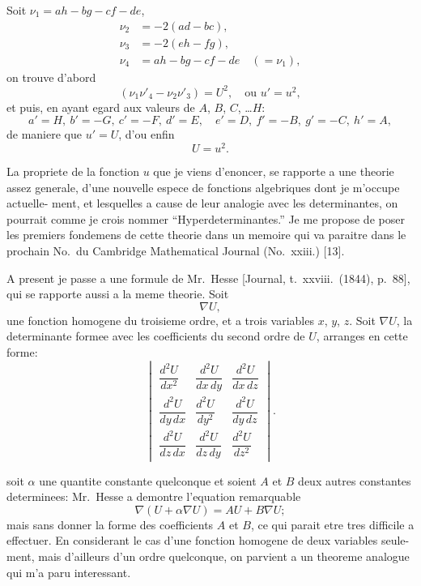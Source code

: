 \documentclass[12pt,a4paper]{article}
\begin{document}
Soit $\nu_1 = ah - bg - cf - de$,
\begin{align*}
\nu_2 &= -2(ad - bc),\\
\nu_3 &= -2(eh - fg),\\
\nu_4 &= ah - bg - cf - de \quad (= \nu_1),
\end{align*}
on trouve d'abord
\[
(\nu_1\nu'_4 - \nu_2\nu'_3) = U^2,\quad \text{ou } u' = u^2,
\]
et puis, en ayant egard aux valeurs de $A$, $B$, $C$, \ldots $H$:
\[
a' = H,\ b' = -G,\ c' = -F,\ d' = E,\quad
e' = D,\ f' = -B,\ g' = -C,\ h' = A,
\]
de maniere que $u' = U$, d'ou enfin
\[
U = u^2.
\]

\newpage
\setcounter{page}{114}

La propriete de la fonction $u$ que je viens d'enoncer, se rapporte a une theorie
assez generale, d'une nouvelle espece de fonctions algebriques dont je m'occupe actuelle-
ment, et lesquelles a cause de leur analogie avec les determinantes, on pourrait comme
je crois nommer ``Hyperdeterminantes.'' Je me propose de poser les premiers fondemens
de cette theorie dans un memoire qui va paraitre dans le prochain No.\ du Cambridge
Mathematical Journal (No.~xxiii.) [13].

A present je passe a une formule de Mr.~Hesse [Journal, t.~xxviii.~(1844), p.~88],
qui se rapporte aussi a la meme theorie. Soit
\[
\nabla U,
\]
une fonction homogene du troisieme ordre, et a trois variables $x$, $y$, $z$. Soit $\nabla U$, la
determinante formee avec les coefficients du second ordre de $U$, arranges en cette forme:
\[
\begin{vmatrix}
\dfrac{d^2U}{dx^2} & \dfrac{d^2U}{dx\,dy} & \dfrac{d^2U}{dx\,dz}\\[1.2ex]
\dfrac{d^2U}{dy\,dx} & \dfrac{d^2U}{dy^2} & \dfrac{d^2U}{dy\,dz}\\[1.2ex]
\dfrac{d^2U}{dz\,dx} & \dfrac{d^2U}{dz\,dy} & \dfrac{d^2U}{dz^2}
\end{vmatrix}.
\]

\newpage
\setcounter{page}{115}

soit $\alpha$ une quantite constante quelconque et soient $A$ et $B$ deux autres constantes
determinees: Mr.~Hesse a demontre l'equation remarquable
\[
\nabla(U + \alpha \nabla U) = AU + B\nabla U;
\]
mais sans donner la forme des coefficients $A$ et $B$, ce qui parait etre tres difficile
a effectuer. En considerant le cas d'une fonction homogene de deux variables seule-
ment, mais d'ailleurs d'un ordre quelconque, on parvient a un theoreme analogue qui
m'a paru interessant.
\end{document}
